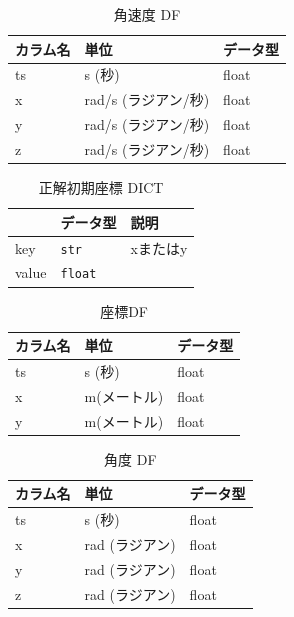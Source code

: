 \begin{table}[h]
	\centering
	\begin{tabular}{lll}
		\toprule
		カラム名 & 単位             & データ型  \\
		\midrule
		ts   & s (秒)          & float \\
		x    & rad/s (ラジアン/秒) & float \\
		y    & rad/s (ラジアン/秒) & float \\
		z    & rad/s (ラジアン/秒) & float \\
		\bottomrule
	\end{tabular}
	\caption{角速度 DF}
\end{table}


\begin{table}[ht]
	\centering
	\label{tab:first-coord-dict}
	\begin{tabular}{lll}
		\hline
		      & {データ型}         & {説明}          \\ \hline
		key   & \texttt{str}   & xまたはy         \\ \hline
		value & \texttt{float} & \makecell{座標} \\ \hline
	\end{tabular}
	\caption{正解初期座標 DICT}
\end{table}




\begin{table}[h]
	\centering
	\begin{tabular}{lll}
		\toprule
		カラム名 & 単位      & データ型  \\
		\midrule
		ts   & s (秒)   & float \\
		x    & m(メートル) & float \\
		y    & m(メートル) & float \\
		\bottomrule
	\end{tabular}
	\caption{座標DF}
\end{table}


\begin{table}[h]
	\centering
	\begin{tabular}{lll}
		\toprule
		カラム名 & 単位         & データ型  \\
		\midrule
		ts   & s (秒)      & float \\
		x    & rad (ラジアン) & float \\
		y    & rad (ラジアン) & float \\
		z    & rad (ラジアン) & float \\
		\bottomrule
	\end{tabular}
	\caption{角度 DF}
\end{table}




